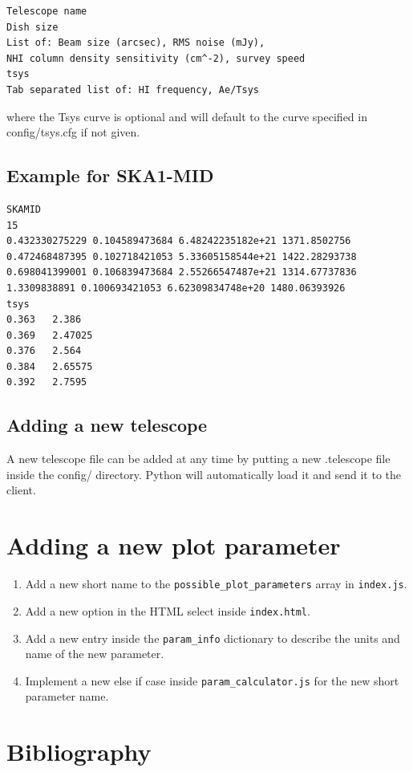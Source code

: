 \documentclass[11pt]{article}
\begin{document}
\begin{verbatim}
Telescope name
Dish size
List of: Beam size (arcsec), RMS noise (mJy), 
NHI column density sensitivity (cm^-2), survey speed
tsys
Tab separated list of: HI frequency, Ae/Tsys
\end{verbatim}
where the Tsys curve is optional and will default to the curve specified in config/tsys.cfg if not given. \subsection{Example for SKA1-MID}
\begin{verbatim}
SKAMID
15 
0.432330275229 0.104589473684 6.48242235182e+21 1371.8502756
0.472468487395 0.102718421053 5.33605158544e+21 1422.28293738
0.698041399001 0.106839473684 2.55266547487e+21 1314.67737836
1.3309838891 0.100693421053 6.62309834748e+20 1480.06393926
tsys
0.363	2.386
0.369	2.47025
0.376	2.564
0.384	2.65575
0.392	2.7595
\end{verbatim}
\subsection{Adding a new telescope}
A new telescope file can be added at any time by putting a new .telescope file inside the config/ directory. Python will automatically load it and send it to the client.
\section{Adding a new plot parameter}
\begin{enumerate}
\item Add a new short name to the \verb|possible_plot_parameters| array in \verb|index.js|.
\item Add a new option in the HTML select inside \verb|index.html|.
\item Add a new entry inside the \verb|param_info| dictionary to describe the units and name of the new parameter.
\item Implement a new else if case inside \verb|param_calculator.js| for the new short parameter name.
\end{enumerate}

\section{Bibliography}
\printbibliography
\end{document}
